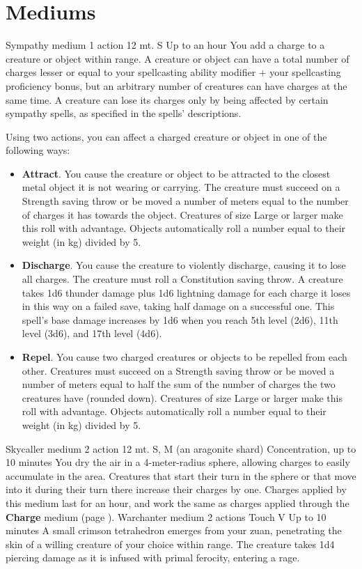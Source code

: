 \section{Mediums} \label{sec::mediums}
{Sympathy medium}
{1 action}
{12 mt.}
{S}
{Up to an hour}
You add a charge to a creature or object within range.
A creature or object can have a total number of charges lesser or equal to your spellcasting ability modifier + your spellcasting proficiency bonus, but an arbitrary number of creatures can have charges at the same time.
A creature can lose its charges only by being affected by certain sympathy spells, as specified in the spells' descriptions.

Using two actions, you can affect a charged creature or object in one of the following ways:
\begin{itemize}
    \item \textbf{Attract}.
    You cause the creature or object to be attracted to the closest metal object it is not wearing or carrying.
    The creature must succeed on a Strength saving throw or be moved a number of meters equal to the number of charges it has towards the object.
    Creatures of size Large or larger make this roll with advantage.
    Objects automatically roll a number equal to their weight (in kg) divided by 5.
    \item \textbf{Discharge}.
    You cause the creature to violently discharge, causing it to lose all charges.
    The creature must roll a Constitution saving throw.
    A creature takes 1d6 thunder damage plus 1d6 lightning damage for each charge it loses in this way on a failed save, taking half damage on a successful one.
    This spell's base damage increases by 1d6 when you reach 5th level (2d6), 11th level (3d6), and 17th level (4d6).
    \item \textbf{Repel}.
    You cause two charged creatures or objects to be repelled from each other.
    Creatures must succeed on a Strength saving throw or be moved a number of meters equal to half the sum of the number of charges the two creatures have (rounded down).
    Creatures of size Large or larger make this roll with advantage.
    Objects automatically roll a number equal to their weight (in kg) divided by 5.
\end{itemize}
{Skycaller medium}
{2 action}
{12 mt.}
{S, M (an aragonite shard)}
{Concentration, up to 10 minutes}
You dry the air in a 4-meter-radius sphere, allowing charges to easily accumulate in the area.
Creatures that start their turn in the sphere or that move into it during their turn there increase their charges by one.
Charges applied by this medium last for an hour, and work the same as charges applied through the \textbf{Charge} medium (page \pageref{medium::charge}).
{Warchanter medium}
{2 actions}
{Touch}
{V}
{Up to 10 minutes}
A small crimson tetrahedron emerges from your zuan, penetrating the skin of a willing creature of your choice within range.
The creature takes 1d4 piercing damage as it is infused with primal ferocity, entering a rage.


